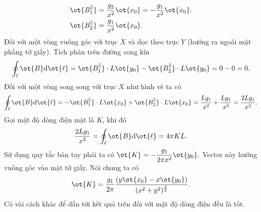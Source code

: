\begin{loigiai}
\begin{enumerate}[1)]
\begin{enumerate}[a)]
\begin{center}
\begin{tikzpicture}[x=0.75pt,y=0.75pt,yscale=-1,xscale=1]
\end{tikzpicture}
        \end{center}
        \begin{align*}
            \ot{B_1^{\parallel}}&=\dfrac{g_2}{x^2}\ot{x_0}=-\dfrac{g_1}{x^2}\ot{x_0}.\\
            \ot{B_2^{\parallel}}&=\dfrac{g_1}{x^2}\ot{x_0}.
        \end{align*}
        Đối với một vòng vuông góc với trục $X$ và dọc theo trục $Y$ (hướng ra ngoài mặt phẳng tờ giấy). Tích phân trên đường cong kín
        \[\oint_{\ell}\ot{B}\mathrm{d}\ot{\ell}=\ot{B_1^{\parallel}}\cdot L\ot{y_0}-\ot{B_2^\parallel}\cdot L\ot{y_0}=0-0=0.\]
        Đối với một vòng song song với trục $X$ như hình vẽ ta có
        \[\oint_{\ell}\ot{B}\mathrm{d}\ot{\ell}=-\ot{B_1^{\parallel}}\cdot L\ot{x_0}+\ot{B_2^{\parallel}}\cdot L \ot{x_0}=\dfrac{Lg_1}{x^2}+\dfrac{Lg_1}{x^2}=\dfrac{2Lg_1}{x^2}.\]
        Gọi mật độ dòng điện mặt là $K$, khi đó 
        \[\dfrac{2Lg_1}{x^2}=\oint_{\ell}\ot{B}\mathrm{d}\ot{\ell}=4\pi KL.\]
        Sử dụng quy tắc bàn tay phải ta có $\ot{K}=-\dfrac{g_1}{2\pi x^2}\ot{y_0}.$ 
        Vector này hướng vuông góc vào mặt tờ giấy. Nói chung ta có
        \[\ot{K}=\dfrac{g_1}{2\pi}\dfrac{(y\ot{x_0}-x\ot{y_0})}{(x^2+y^2)^{\frac{3}{2}}}.\]
        Có vài cách khác để dẫn tới kết quả trên đối với mật độ dòng điện đều là tốt.
    \end{enumerate}
\end{enumerate}
\end{loigiai}


